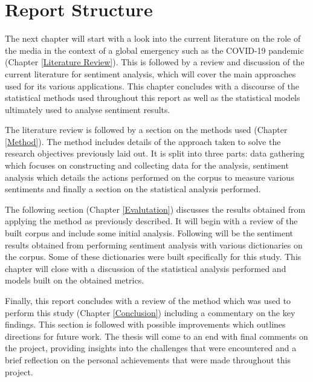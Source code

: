 \section{Report Structure}\label{Report Structure}

The next chapter will start with a look into the current literature on the role of the media in the context of a global emergency such as the COVID-19 pandemic (Chapter \ref{Literature Review}). This is followed by a review and discussion of the current literature for sentiment analysis, which will cover the main approaches used for its various applications. This chapter concludes with a discourse of the statistical methods used throughout this report as well as the statistical models ultimately used to analyse sentiment results.

The literature review is followed by a section on the methods used (Chapter \ref{Method}). The method includes details of the approach taken to solve the research objectives previously laid out. It is split into three parts: data gathering which focuses on constructing and collecting data for the analysis, sentiment analysis which details the actions performed on the corpus to measure various sentiments and finally a section on the statistical analysis performed.

The following section (Chapter \ref{Evalutation}) discusses the results obtained from applying the method as previously described. It will begin with a review of the built corpus and include some initial analysis. Following will be the sentiment results obtained from performing sentiment analysis with various dictionaries on the corpus. Some of these dictionaries were built specifically for this study. This chapter will close with a discussion of the statistical analysis performed and models built on the obtained metrics.

Finally, this report concludes with a review of the method which was used to perform this study (Chapter \ref{Conclusion}) including a commentary on the key findings. This section is followed with possible improvements which outlines directions for future work. The thesis will come to an end with final comments on the project, providing insights into the challenges that were encountered and a brief reflection on the personal achievements that were made throughout this project.
